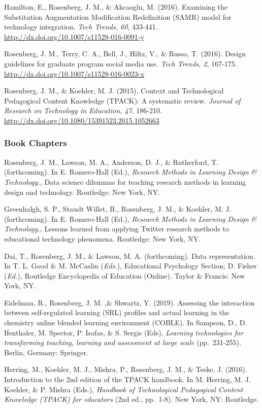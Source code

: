 \documentclass[14,]{article}
\begin{document}
Hamilton, E., Rosenberg, J. M., \& Akcaoglu, M. (2016). Examining the
Substitution Augmentation Modification Redefinition (SAMR) model for
technology integration. \emph{Tech Trends, 60}, 433-441.
\url{http://dx.doi.org/10.1007/s11528-016-0091-y}

Rosenberg, J. M., Terry, C. A., Bell, J., Hiltz, V., \& Russo, T.
(2016). Design guidelines for graduate program social media use.
\emph{Tech Trends, 2}, 167-175.
\url{http://dx.doi.org/10.1007/s11528-016-0023-x}

Rosenberg, J. M., \& Koehler, M. J. (2015). Context and Technological
Pedagogical Content Knowledge (TPACK): A systematic review.
\emph{Journal of Research on Technology in Education, 47}, 186-210.
\url{http://dx.doi.org/10.1080/15391523.2015.1052663}

\subsubsection{Book Chapters}\label{book-chapters}

Rosenberg, J. M., Lawson, M. A., Anderson, D. J., \& Rutherford, T.
(forthcoming). In E. Romero-Hall (Ed.), \emph{Research Methods in
Learning Design \& Technology.}, Data science dilemmas for teaching
research methods in learning design and technology. Routledge: New York,
NY.

Greenhalgh, S. P., Staudt Willet, B., Rosenberg, J. M., \& Koehler, M.
J. (forthcoming). In E. Romero-Hall (Ed.), \emph{Research Methods in
Learning Design \& Technology.}, Lessons learned from applying Twitter
research methods to educational technology phenomena. Routledge: New
York, NY.

Dai, T., Rosenberg, J. M., \& Lawson, M. A. (forthcoming). Data
representation. In T. L. Good \& M. McCaslin (\emph{Eds.}), Educational
Psychology Section; D. Fisher (\emph{Ed.}), Routledge Encyclopedia of
Education (Online). Taylor \& Francis: New York, NY.

Eidelman, R., Rosenberg, J. M. ,\& Shwartz, Y. (2019). Assessing the
interaction between self-regulated learning (SRL) profiles and actual
learning in the chemistry online blended learning environment (COBLE).
In Sampson, D., D. Ifenthaler, M. Spector, P. Isafas, \& S. Sergis
(Eds), \emph{Learning technologies for transforming teaching, learning
and assessment at large scale} (pp.~231-255). Berlin, Germany: Springer.

Herring, M., Koehler, M. J., Mishra, P., Rosenberg, J. M., \& Teske, J.
(2016). Introduction to the 2nd edition of the TPACK handbook. In M.
Herring, M. J. Koehler, \& P. Mishra (Eds.), \emph{Handbook of
Technological Pedagogical Content Knowledge (TPACK) for educators} (2nd
ed., pp.~1-8). New York, NY: Routledge.
\end{document}
